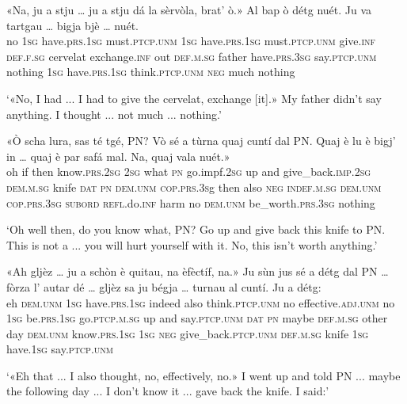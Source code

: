 \begin{linenumbers}
	\gll «Na, ju a stju … ju a stju dá la sèrvòla, brat’ ò.» Al bap ò détg nuét. Ju va tartgau … bigja bjè … nuét.\\
	no \textsc{1sg} have.p\textsc{rs.1sg} must.\textsc{ptcp.unm} {} \textsc{1sg} have.\textsc{prs.1sg} must.\textsc{ptcp.unm} give.\textsc{inf} \textsc{def.f.sg} cervelat exchange.\textsc{inf} out \textsc{def.m.sg} father have.\textsc{prs.3sg} say.\textsc{ptcp.unm} nothing \textsc{1sg} have.\textsc{prs.1sg} think.\textsc{ptcp.unm} {} \textsc{neg} much {} nothing\\
\end{linenumbers}
\medskip
\glt `«No, I had ... I had to give the cervelat, exchange [it].» My father didn't say anything. I thought ... not much ... nothing.'
\medskip

\begin{linenumbers}
	\gll  «Ò scha lura, sas té tgé, PN? Vò sé a tùrna quaj cuntí dal PN. Quaj è lu è bigj’ in … quaj è par safá mal. Na, quaj vala nuét.»  \\
	oh if then know.\textsc{prs.2sg} \textsc{2sg} what \textsc{pn} go.impf.\textsc{2sg} up and give\_back.\textsc{imp.2sg} \textsc{dem.m.sg} knife \textsc{dat} \textsc{pn} \textsc{dem.unm} \textsc{cop.prs.3s}g then also \textsc{neg} \textsc{indef.m.sg} {} \textsc{dem.unm} \textsc{cop.prs.3sg} \textsc{subord}  \textsc{refl}.do.\textsc{inf} harm no \textsc{dem.unm} be\_worth.\textsc{prs.3sg} nothing\\
\end{linenumbers}
\medskip
\glt `Oh well then, do you know what, PN? Go up and give back this knife to PN. This is not a ... you will hurt yourself with it. No, this isn't worth anything.'
\medskip

\begin{linenumbers}
	\gll «Ah gljèz … ju a schòn è quitau, na èfèctíf, na.» Ju sùn jus sé a détg dal PN … fòrza l’ autar dé … gljèz sa ju bégja … turnau al cuntí. Ju a détg:   \\
	eh \textsc{dem.unm} {} \textsc{1sg} have.\textsc{prs.1sg} indeed also think.\textsc{ptcp.unm} no effective.\textsc{adj.unm} no \textsc{1sg} be.\textsc{prs.1sg} go.\textsc{ptcp.m.sg} up and say.\textsc{ptcp.unm} \textsc{dat} \textsc{pn} {} maybe \textsc{def.m.sg} other day {} \textsc{dem.unm} know.\textsc{prs.1sg} \textsc{1sg} \textsc{neg} {} give\_back.\textsc{ptcp.unm} \textsc{def.m.sg} knife \textsc{1sg} have.\textsc{1sg} say.\textsc{ptcp.unm} \\
\end{linenumbers}
\medskip
\glt `«Eh that ... I also thought, no, effectively, no.» I went up and told PN ... maybe the following day ... I don't know it ... gave back the knife. I said:'
\medskip

